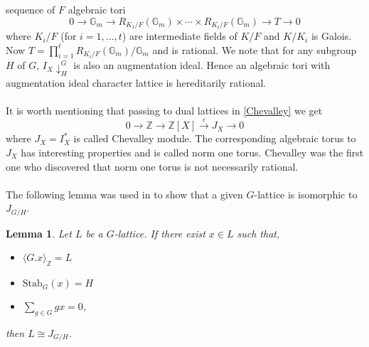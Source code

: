 \documentclass[a4paper, 14pt]{extarticle}
\theoremstyle{plain}
\newtheorem{lemma}[theorem]{Lemma}
\theoremstyle{definition}
\newcommand{\Z}{\ensuremath{\mathbb{Z}}}
\begin{document}
sequence of $F$ algebraic tori
$$0 \longrightarrow \mathbb{G}_m \longrightarrow R_{K_1/F}(\mathbb{G}_m) \times \cdots \times R_{K_t/F}(\mathbb{G}_m) \longrightarrow  T \longrightarrow 0$$
where $K_i/F$ (for $i = 1, \ldots ,t $) are intermediate fields of $K/F$ and $K/K_i$ is 
Galois. Now $T = \prod^t_{i = 1}R_{K_i/F}(\mathbb{G}_m)/\mathbb{G}_m$ and is rational. 
We note that for any subgroup $H$ of $G$, ${I_X}\downarrow^G_H$ is also an augmentation 
ideal. Hence an algebraic tori with augmentation ideal character lattice is hereditarily 
rational.\\
\\
It is worth mentioning that passing to dual lattices in \ref{Chevalley} we get 
$$0 \longrightarrow \Z \longrightarrow \Z [X] \overset{\varepsilon} \longrightarrow  J_{X} \longrightarrow 0$$
where $J_{X}= I^{\ast}_X$ is called Chevalley module. The corresponding algebraic 
torus to $J_X$ has interesting properties and is called norm one torus. Chevalley 
was the first one who discovered that norm one torus is not necessarily rational. \\
\\
The following lemma was used in \cite{Nicole1} to show that a given $G$-lattice 
is isomorphic to $J_{G/H}$.
\begin{lemma}\cite[Remark 4.1]{Nicole1}
Let $L$ be a $G$-lattice. If there exist $x\in L$ such that,
\begin{itemize}
\item $\langle G.x \rangle_{\Z} = L$
\item $\mathrm{Stab}_G(x) = H$
\item $\sum_{g \in G}gx = 0$,
\end{itemize}
then $L \cong J_{G/H}$.
\end{lemma}
\end{document}
